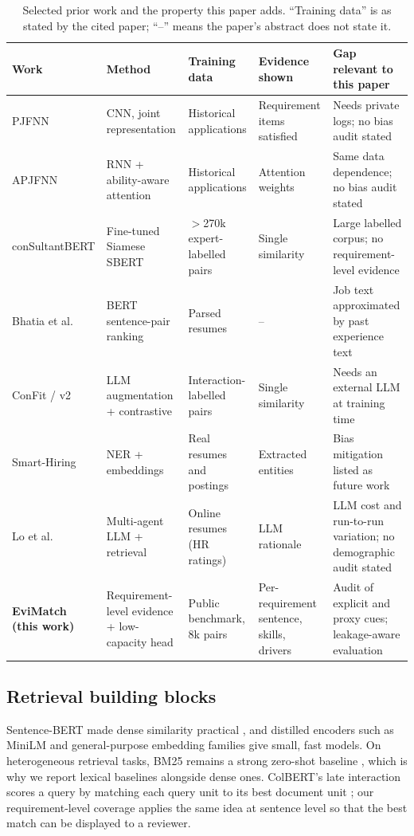 \begin{table}[t]
\caption{Selected prior work and the property this paper adds. ``Training data'' is as stated by the
cited paper; ``--'' means the paper's abstract does not state it.}
\label{tab:related}
\centering\small
\begin{tabular}{P{3.0cm}P{3.3cm}P{3.4cm}P{3.0cm}P{3.7cm}}
\toprule
Work & Method & Training data & Evidence shown & Gap relevant to this paper \\
\midrule
PJFNN \cite{zhu2018pjfnn} & CNN, joint representation & Historical applications & Requirement items satisfied & Needs private logs; no bias audit stated \\
APJFNN \cite{qin2018apjfnn} & RNN + ability-aware attention & Historical applications & Attention weights & Same data dependence; no bias audit stated \\
conSultantBERT \cite{lavi2021consultantbert} & Fine-tuned Siamese SBERT & $>$270k expert-labelled pairs & Single similarity & Large labelled corpus; no requirement-level evidence \\
Bhatia et al. \cite{bhatia2019endtoend} & BERT sentence-pair ranking & Parsed resumes & -- & Job text approximated by past experience text \\
ConFit / v2 \cite{yu2024confit,yu2025confitv2} & LLM augmentation + contrastive & Interaction-labelled pairs & Single similarity & Needs an external LLM at training time \\
Smart-Hiring \cite{khelkhal2025smarthiring} & NER + embeddings & Real resumes and postings & Extracted entities & Bias mitigation listed as future work \\
Lo et al. \cite{lo2025multiagent} & Multi-agent LLM + retrieval & Online resumes (HR ratings) & LLM rationale & LLM cost and run-to-run variation; no demographic audit stated \\
\textbf{EviMatch (this work)} & Requirement-level evidence + low-capacity head & Public benchmark, 8k pairs & Per-requirement sentence, skills, drivers & Audit of explicit and proxy cues; leakage-aware evaluation \\
\bottomrule
\end{tabular}
\end{table}

\subsection{Retrieval building blocks}
Sentence-BERT made dense similarity practical \cite{reimers2019sbert}, and distilled encoders such
as MiniLM \cite{wang2020minilm} and general-purpose embedding families \cite{xiao2024cpack} give small,
fast models. On heterogeneous retrieval tasks, BM25 \cite{robertson2009bm25} remains a strong zero-shot
baseline \cite{thakur2021beir}, which is why we report lexical baselines alongside dense ones. ColBERT's
late interaction scores a query by matching each query unit to its best document unit
\cite{khattab2020colbert}; our requirement-level coverage applies the same idea at sentence level so that
the best match can be displayed to a reviewer.


